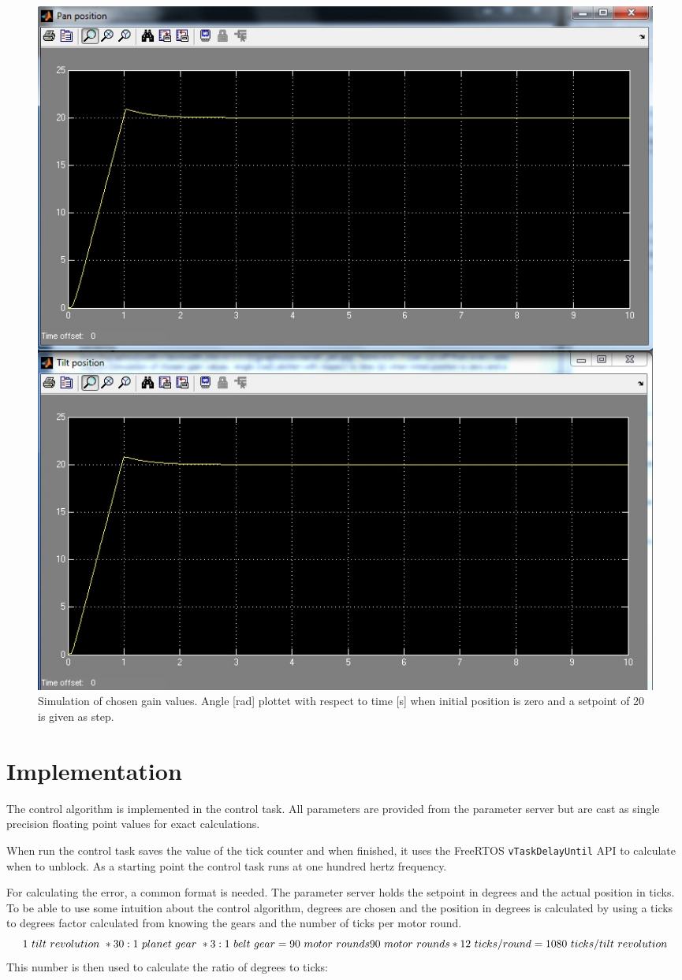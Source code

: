 \begin{figure}[htb]
	\centering
	\includegraphics[width=\textwidth,trim=0 0 0 0]{graphics/screensh_pid.jpg} %
	\caption{Simulation of chosen gain values. Angle [rad] plottet with respect to time [s] when initial position is zero and a setpoint of 20 is given as step.}
	\label{fig:chosen_plot}			%
\end{figure}

\section{Implementation}
The control algorithm is implemented in the control task. All parameters are provided from the parameter server but are cast as single precision floating point values for exact calculations.

When run the control task saves the value of the tick counter and when finished, it uses the FreeRTOS \texttt{vTaskDelayUntil} API to calculate when to unblock. As a starting point the control task runs at one hundred hertz frequency.

For calculating the error, a common format is needed. The parameter server holds the setpoint in degrees and the actual position in ticks. To be able to use some intuition about the control algorithm, degrees are chosen and the position in degrees is calculated by using a ticks to degrees factor calculated from knowing the gears and the number of ticks per motor round.
\begin{equation}
1 \ tilt \ revolution \ * 30:1 \ planet \ gear \ * 3:1 \ belt \ gear = 90 \ motor \ rounds \\ 90 \ motor \ rounds * 12 \ ticks/round = 1080 \ ticks/tilt \ revolution 
\end{equation}
This number is then used to calculate the ratio of degrees to ticks:

